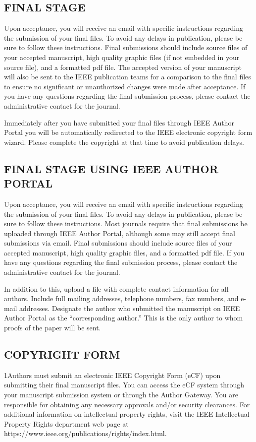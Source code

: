 \documentclass{ieeetmlcn}
\begin{document}
\subsection{FINAL STAGE}
Upon acceptance, you will receive an email with specific instructions regarding the submission of your final files. To avoid any delays in publication, please be sure to follow these instructions. Final submissions should include source files of your accepted manuscript, high quality graphic files (if not embedded in your source file), and a formatted pdf file. The accepted version of your manuscript will also be sent to the IEEE publication teams for a comparison to the final files to ensure no significant or unauthorized changes were made after acceptance. If you have any questions regarding the final submission process, please contact the administrative contact for the journal. 

Immediately after you have submitted your final files through IEEE Author Portal you will be automatically redirected to the IEEE electronic copyright form wizard. Please complete the copyright at that time to avoid publication delays. 

\subsection{FINAL STAGE USING IEEE AUTHOR PORTAL}
Upon acceptance, you will receive an email with specific instructions
regarding the submission of your final files. To avoid any delays in
publication, please be sure to follow these instructions. Most journals
require that final submissions be uploaded through IEEE Author Portal,
although some may still accept final submissions via email. Final
submissions should include source files of your accepted manuscript, high
quality graphic files, and a formatted pdf file. If you have any questions
regarding the final submission process, please contact the administrative
contact for the journal.

In addition to this, upload a file with complete contact information for all
authors. Include full mailing addresses, telephone numbers, fax numbers, and
e-mail addresses. Designate the author who submitted the manuscript on
IEEE Author Portal as the ``corresponding author.'' This is the only
author to whom proofs of the paper will be sent.

\subsection{COPYRIGHT FORM}
\looseness1Authors must submit an electronic IEEE Copyright Form (eCF) upon submitting
their final manuscript files. You can access the eCF system through your
manuscript submission system or through the Author Gateway. You are
responsible for obtaining any necessary approvals and/or security
clearances. For additional information on intellectual property rights,
visit the IEEE Intellectual Property Rights department web page at
https://\discretionary{}{}{}www.ieee.org/\discretionary{}{}{}publications/\discretionary{}{}{}rights/\discretionary{}{}{}index.html.
\end{document}
